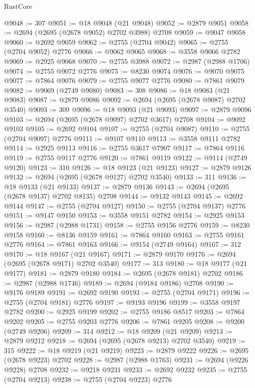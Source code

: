 \begin{lexlean}{RustCore}
\begin{coremodule}
@9048 := 307
@9051 := @18 @9048 (@21 @9048)
@9052 := @2879 @9051
@9058 := @2694 (@2695 (@2678 @9052) @2702 @3988) @2708
@9059 := @9047 @9058
@9060 := @2692 @9059
@9062 := @2755 (@2704 @9042)
@9065 := @2755 (@2704 @9052) @2776
@9066 := @9062 @9065
@9068 := @3558 @9066 @2782
@9069 := @2925 @9068
@9070 := @2755 @3988
@9072 := @2987 (@2988 @1706)
@9074 := @2755 @9072 @2776
@9075 := @8230 @9074
@9076 := @9070 @9075
@9077 := @7864 @9076
@9079 := @2755 @9077 @2776
@9080 := @7861 @9079
@9082 := @9069 (@2749 @9080)
@9083 := 308
@9086 := @18 @9083 (@21 @9083)
@9087 := @2879 @9086
@9092 := @2694 (@2695 (@2678 @9087) @2702 @3540)
@9093 := 309
@9096 := @18 @9093 (@21 @9093)
@9097 := @2879 @9096
@9103 := @2694 (@2695 (@2678 @9097) @2702 @3617) @2708
@9104 := @9092 @9103
@9105 := @2692 @9104
@9107 := @2755 (@2704 @9087)
@9110 := @2755 (@2704 @9097) @2776
@9111 := @9107 @9110
@9113 := @3558 @9111 @2782
@9114 := @2925 @9113
@9116 := @2755 @3617 @7907
@9117 := @7864 @9116
@9119 := @2755 @9117 @2776
@9120 := @7861 @9119
@9122 := @9114 (@2749 @9120)
@9123 := 310
@9126 := @18 @9123 (@21 @9123)
@9127 := @2879 @9126
@9132 := @2694 (@2695 (@2678 @9127) @2702 @3540)
@9133 := 311
@9136 := @18 @9133 (@21 @9133)
@9137 := @2879 @9136
@9143 := @2694 (@2695 (@2678 @9137) @2702 @8135) @2708
@9144 := @9132 @9143
@9145 := @2692 @9144
@9147 := @2755 (@2704 @9127)
@9150 := @2755 (@2704 @9137) @2776
@9151 := @9147 @9150
@9153 := @3558 @9151 @2782
@9154 := @2925 @9153
@9156 := @2987 (@2988 @1731)
@9158 := @2755 @9156 @2776
@9159 := @8230 @9158
@9160 := @8136 @9159
@9161 := @7864 @9160
@9163 := @2755 @9161 @2776
@9164 := @7861 @9163
@9166 := @9154 (@2749 @9164)
@9167 := 312
@9170 := @18 @9167 (@21 @9167)
@9171 := @2879 @9170
@9176 := @2694 (@2695 (@2678 @9171) @2702 @3540)
@9177 := 313
@9180 := @18 @9177 (@21 @9177)
@9181 := @2879 @9180
@9184 := @2695 (@2678 @9181) @2702
@9186 := @2987 (@2988 @1746)
@9189 := @2694 (@9184 @9186) @2708
@9190 := @9176 @9189
@9191 := @2692 @9190
@9193 := @2755 (@2704 @9171)
@9196 := @2755 (@2704 @9181) @2776
@9197 := @9193 @9196
@9199 := @3558 @9197 @2782
@9200 := @2925 @9199
@9202 := @2755 @9186 @8517
@9203 := @7864 @9202
@9205 := @2755 @9203 @2776
@9206 := @7861 @9205
@9208 := @9200 (@2749 @9206)
@9209 := 314
@9212 := @18 @9209 (@21 @9209)
@9213 := @2879 @9212
@9218 := @2694 (@2695 (@2678 @9213) @2702 @3540)
@9219 := 315
@9222 := @18 @9219 (@21 @9219)
@9223 := @2879 @9222
@9226 := @2695 (@2678 @9223) @2702
@9228 := @2987 (@2988 @1763)
@9231 := @2694 (@9226 @9228) @2708
@9232 := @9218 @9231
@9233 := @2692 @9232
@9235 := @2755 (@2704 @9213)
@9238 := @2755 (@2704 @9223) @2776

\end{coremodule}
\end{lexlean}

